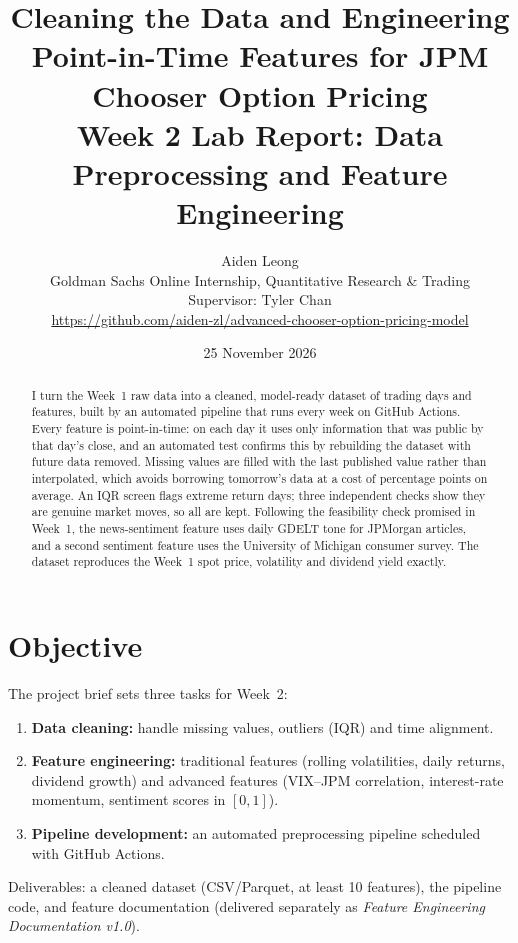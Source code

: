 \documentclass[11pt]{article}
\title{\textbf{Cleaning the Data and Engineering Point-in-Time Features for JPM Chooser Option Pricing}\\[4pt]
\large Week 2 Lab Report: Data Preprocessing and Feature Engineering}
\author{Aiden Leong\\[2pt]
\small Goldman Sachs Online Internship, Quantitative Research \& Trading\\
\small Supervisor: Tyler Chan\\
\small \url{https://github.com/aiden-zl/advanced-chooser-option-pricing-model}}
\date{25 November 2026}
\begin{document}
\maketitle

\begin{abstract}
\noindent
I turn the Week~1 raw data into a cleaned, model-ready dataset of \wRows{} trading days and \wFeatures{} features,
built by an automated pipeline that runs every week on GitHub Actions. Every feature is point-in-time: on each day
it uses only information that was public by that day's close, and an automated test confirms this by rebuilding the
dataset with future data removed. Missing values are filled with the last published value rather than interpolated,
which avoids borrowing tomorrow's data at a cost of \wGapmeandiffdgsone{} percentage points on average. An IQR screen
flags \wFlagsthree{} extreme return days; three independent checks show they are genuine market moves, so all are
kept. Following the feasibility check promised in Week~1, the news-sentiment feature uses daily GDELT tone for
JPMorgan articles, and a second sentiment feature uses the University of Michigan consumer survey. The dataset
reproduces the Week~1 spot price, volatility and dividend yield exactly.
\end{abstract}

\section{Objective}
The project brief sets three tasks for Week~2:
\begin{enumerate}
  \item \textbf{Data cleaning:} handle missing values, outliers (IQR) and time alignment.
  \item \textbf{Feature engineering:} traditional features (rolling volatilities, daily returns, dividend growth) and
        advanced features (VIX--JPM correlation, interest-rate momentum, sentiment scores in $[0,1]$).
  \item \textbf{Pipeline development:} an automated preprocessing pipeline scheduled with GitHub Actions.
\end{enumerate}
Deliverables: a cleaned dataset (CSV/Parquet, at least 10 features), the pipeline code, and feature documentation
(delivered separately as \emph{Feature Engineering Documentation v1.0}).

\end{document}
